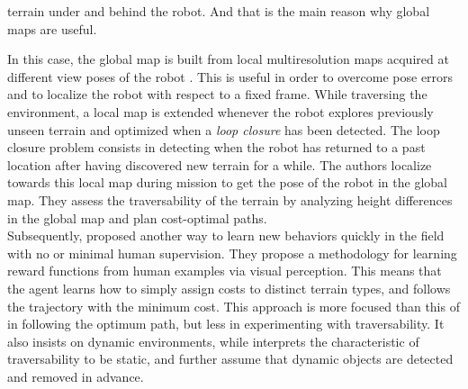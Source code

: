\documentclass[12pt,a4paper]{report}
\newcommand{\term}{\textit}
\begin{document}
	terrain under and behind the robot. And that is the main reason why global maps 
	are useful. 
	\par
	In this case, the global map is built from local multiresolution maps acquired at 
	different view poses of the robot \citep{Droeschel}. This is useful in order to 
	overcome pose errors and to localize the robot with respect to a fixed frame. 
	While traversing the environment, a local map is extended whenever the robot 
	explores previously unseen terrain and optimized when a \term{loop closure} has 
	been detected. The loop closure problem consists in detecting when the robot has 
	returned to a past location after having discovered new terrain for a while. The 
	authors localize towards this local map during mission to get the pose of the 
	robot in the global map. They assess the traversability of the terrain by 
	analyzing height differences in the global map and plan cost-optimal paths.
	\\
	
	Subsequently, \citet{Wigness} proposed another way to learn new behaviors quickly 
	in the field with no or minimal human supervision. They propose a methodology for 
	learning reward functions from human examples via visual perception. This means 
	that the agent learns how to simply assign costs to distinct terrain types, and 
	follows the trajectory with the minimum cost. This approach is more focused than 
	this of \citet{Suger} in following the optimum path, but less in experimenting 
	with traversability. It also insists on dynamic environments, while \citet{Suger} 
	interprets the characteristic of traversability to be static, and further assume 
	that dynamic objects are detected and removed in advance.
	\\
	
\end{document}
